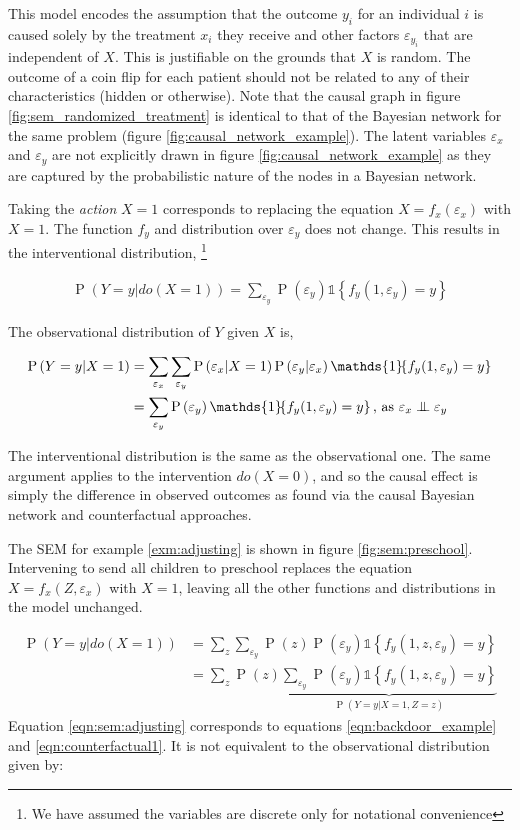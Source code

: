 \documentclass[11pt,a4paper,twoside]{report}
\newcommand{\set}[1]{\left\{#1\right\}}
\newcommand{\ind}[1]{\mathds{1}\!\!\set{#1}}
\newcommand{\eqn}[1]{\begin{align}#1\end{align}}
\renewcommand{\P}[1]{\operatorname{P}\left(#1\right)}
\theoremstyle{plain}
\theoremstyle{definition}
\let\epsilon\varepsilon
\newcommand{\ci}{\mathrel{\perp\mspace{-10mu}\perp}}
\begin{document}
This model encodes the assumption that the outcome $y_{i}$ for an individual $i$ is caused solely by the treatment $x_{i}$ they receive and other factors $\epsilon_{y_{i}}$ that are independent of $X$. This is justifiable on the grounds that $X$ is random. The outcome of a coin flip for each patient should not be related to any of their characteristics (hidden or otherwise). Note that the causal graph in figure \ref{fig:sem_randomized_treatment} is identical to that of the Bayesian network for the same problem (figure \ref{fig:causal_network_example}). The latent variables $\epsilon_x$ and $\epsilon_y$ are not explicitly drawn in figure \ref{fig:causal_network_example} as they are captured by the probabilistic nature of the nodes in a Bayesian network.

Taking the \emph{action} $X=1$ corresponds to replacing the equation $X=f_x(\epsilon_x)$ with $X=1$. The function $f_y$ and distribution over $\epsilon_y$ does not change. This results in the interventional distribution, \footnote{We have assumed the variables are discrete only for notational convenience}

\eqn {
\P{Y=y|do(X=1)} = \sum_{\epsilon_y}\P{\epsilon_y}\ind{f_y(1,\epsilon_y)=y}
}

The observational distribution of $Y$ given $X$ is,

\eqn{
\P{Y=y|X=1} &= \sum_{\epsilon_x}\sum_{\epsilon_y}\P{\epsilon_x|X=1}\P{\epsilon_y|\epsilon_x}\ind{f_y(1,\epsilon_y)=y} \\
& = \sum_{\epsilon_y}\P{\epsilon_y}\ind{f_y(1,\epsilon_y)=y} \text{, as } \epsilon_x \ci \epsilon_y
}

The interventional distribution is the same as the observational one. The same argument applies to the intervention $do(X=0)$, and so the causal effect is simply the difference in observed outcomes as found via the causal Bayesian network and counterfactual approaches. 

The SEM for example \ref{exm:adjusting} is shown in figure \ref{fig:sem:preschool}. Intervening to send all children to preschool replaces the equation $X = f_x(Z,\epsilon_x)$ with $X=1$, leaving all the other functions and distributions in the model unchanged. 

\eqn{
\P{Y=y|do(X=1)} &= \sum_{z}\sum_{\epsilon_y}\P{z}\P{\epsilon_y}\ind{f_y(1,z,\epsilon_y)=y} \\
\label{eqn:sem:adjusting}
&=\sum_{z}\P{z}\underbrace{\sum_{\epsilon_y}\P{\epsilon_y}\ind{f_y(1,z,\epsilon_y)=y}}_{\P{Y=y|X=1,Z=z}}
}
Equation \ref{eqn:sem:adjusting} corresponds to equations \ref{eqn:backdoor_example} and \ref{eqn:counterfactual1}. It is not equivalent to the observational distribution given by:
\end{document}
